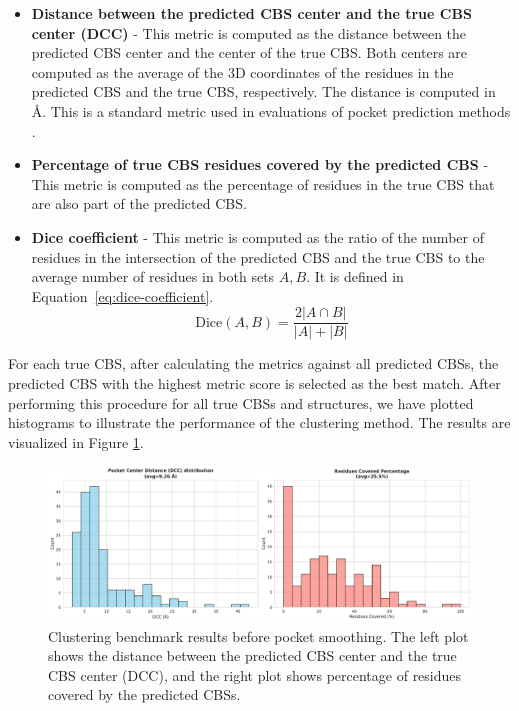 \begin{itemize}
    \item \textbf{Distance between the predicted CBS center and the true CBS center (DCC)} - This metric is computed as the distance between the predicted CBS center and the center of the true CBS. Both centers are computed as the average of the 3D coordinates of the residues in the predicted CBS and the true CBS, respectively. The distance is computed in \AA. This is a standard metric used in evaluations of pocket prediction methods \cite{kandel2021puresnet}.
    \item \textbf{Percentage of true CBS residues covered by the predicted CBS} - This metric is computed as the percentage of residues in the true CBS that are also part of the predicted CBS.
    \item \textbf{Dice coefficient} - This metric is computed as the ratio of the number of residues in the intersection of the predicted CBS and the true CBS to the average number of residues in both sets $A, B$. It is defined in Equation~\ref{eq:dice-coefficient}.
    \begin{equation}
        \text{Dice}(A, B) = \frac{2 |A \cap B|}{|A| + |B|}
        \label{eq:dice-coefficient}
    \end{equation}
\end{itemize}

For each true CBS, after calculating the metrics against all predicted CBSs, the predicted CBS with the highest metric score is selected as the best match. After performing this procedure for all true CBSs and structures, we have plotted histograms to illustrate the performance of the clustering method. The results are visualized in Figure \ref{fig:clustering-benchmark}.

\begin{figure}[htbp]
    \centering
    \includegraphics[width=\textwidth]{img/non-smoothened-1.pdf}
    \caption{Clustering benchmark results before pocket smoothing. The left plot shows the distance between the predicted CBS center and the true CBS center (DCC), and the right plot shows percentage of residues covered by the predicted CBSs.}
    \label{fig:clustering-benchmark}
\end{figure}

